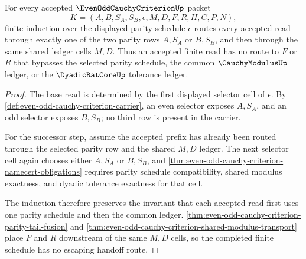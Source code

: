 \begin{theorem}
\label{thm:even-odd-cauchy-induction-lock}
For every accepted $\EvenOddCauchyCriterionUp$ packet
$$
K=(A,B,S_A,S_B,\epsilon,M,D,F,R,H,C,P,N),
$$
finite induction over the displayed parity schedule $\epsilon$ routes every accepted read through exactly one of the two parity rows $A,S_A$ or $B,S_B$, and then through the same shared ledger cells $M,D$. Thus an accepted finite read has no route to $F$ or $R$ that bypasses the selected parity schedule, the common $\CauchyModulusUp$ ledger, or the $\DyadicRatCoreUp$ tolerance ledger.
\end{theorem}
\begin{proof}
The base read is determined by the first displayed selector cell of $\epsilon$. By \autoref{def:even-odd-cauchy-criterion-carrier}, an even selector exposes $A,S_A$, and an odd selector exposes $B,S_B$; no third row is present in the carrier.

For the successor step, assume the accepted prefix has already been routed through the selected parity row and the shared $M,D$ ledger. The next selector cell again chooses either $A,S_A$ or $B,S_B$, and \autoref{thm:even-odd-cauchy-criterion-namecert-obligations} requires parity schedule compatibility, shared modulus exactness, and dyadic tolerance exactness for that cell.

The induction therefore preserves the invariant that each accepted read first uses one parity schedule and then the common ledger. \autoref{thm:even-odd-cauchy-criterion-parity-tail-fusion} and \autoref{thm:even-odd-cauchy-criterion-shared-modulus-transport} place $F$ and $R$ downstream of the same $M,D$ cells, so the completed finite schedule has no escaping handoff route.
\end{proof}

